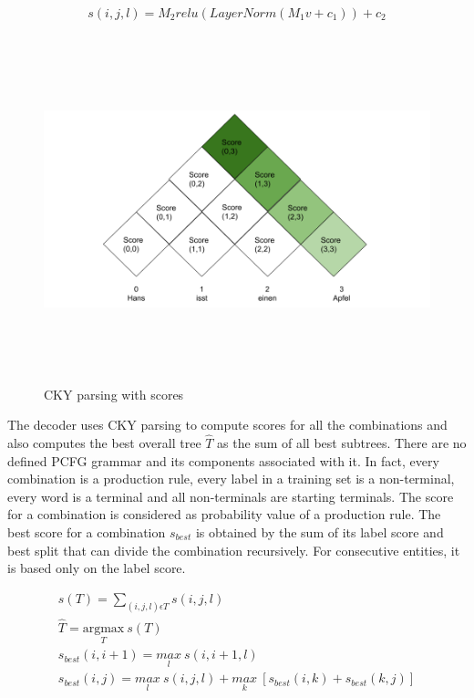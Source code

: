\documentclass[a4paper, 11pt]{article}
\begin{document}
\begin{align*}
s(i,j,l) = M_2relu(LayerNorm(M_1v + c_1)) + c_2
\end{align*}

\begin{figure}[H]
    \centering
    \includegraphics[width=\textwidth,height=10cm,keepaspectratio=true]
    {cky-parsing-chart-3.png}
    \caption{
        CKY parsing with scores
    }
    \label{fig:CKY}
\end{figure}

The decoder uses CKY parsing to compute scores for all the combinations and also computes the best overall tree $\hat{T}$ as the sum of all best subtrees. There are no defined PCFG grammar and its components associated with it. In fact, every combination is a production rule, every label in a training set is a non-terminal, every word is a terminal and all non-terminals are starting terminals. The score for a combination is considered as probability value of a production rule. The best score for a combination $s_{best}$ is obtained by the sum of its label score and best split that can divide the combination recursively. For consecutive entities, it is based only on the label score.

\begin{align*}
s(T) = \sum_{(i,j,l) \epsilon T}s(i,j,l) \\
\hat{T} = \underset{T}{\mathrm{argmax}}\ s(T) \\
s_{best}(i,i+1) = \underset{l}{max}\ s(i,i+1,l) \\
s_{best}(i,j) = \underset{l}{max}\ s(i,j,l) + \underset{k}{max}\ {\left[s_{best}(i,k) + s_{best}(k,j)\right]}
\end{align*}
\end{document}
